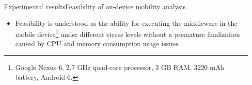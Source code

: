 \documentclass[8pt,xcolor={dvipsnames},handout]{beamer}
\begin{document}
\begin{frame}{Experimental results}{Feasibility of on-device mobility analysis}
{
  \small{}
\begin{itemize}
  \item Feasibility is understood as the ability for executing the middleware in the mobile device\footnote{\scriptsize Google Nexus 6, 2.7 GHz quad-core processor, 3 GB RAM, 3220 mAh battery, Android 6.} under different stress levels without a premature finalization caused by CPU and memory consumption usage issues.
\end{itemize}
}

\begin{table}
\centering
\caption{Summary of results of first experiment (SP = stay point).}
\label{tbl:experiment-1}
\end{table}
\end{frame}
\end{document}
